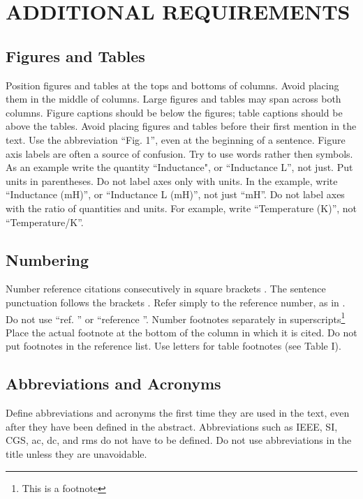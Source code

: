 \documentclass[a4paper, 10pt, conference]{ieeeconf}      %
\begin{document}
\section{ADDITIONAL REQUIREMENTS}

\subsection{Figures and Tables}

Position figures and tables at the tops and bottoms of columns.
Avoid placing them in the middle of columns. Large figures and tables
may span across both columns. Figure captions should be below the figures;
 table captions should be above the tables. Avoid placing figures and tables
  before their first mention in the text. Use the abbreviation ``Fig. 1'',
  even at the beginning of a sentence.
Figure axis labels are often a source of confusion.
Try to use words rather then symbols. As an example write the quantity ``Inductance",
 or ``Inductance L'', not just.
 Put units in parentheses. Do not label axes only with units.
 In the example, write ``Inductance (mH)'', or ``Inductance L (mH)'', not just ``mH''.
 Do not label axes with the ratio of quantities and units.
 For example, write ``Temperature (K)'', not ``Temperature/K''.

\subsection{Numbering}

Number reference citations consecutively in square brackets \cite{c1}.
 The sentence punctuation follows the brackets \cite{c2}.
 Refer simply to the reference number, as in \cite{c3}.
 Do not use ``ref. \cite{c3}'' or ``reference \cite{c3}''.
Number footnotes separately in superscripts\footnote{This is a footnote}
Place the actual footnote at the bottom of the column in which it is cited.
Do not put footnotes in the reference list.
Use letters for table footnotes (see Table I).

\subsection{Abbreviations and Acronyms}

Define abbreviations and acronyms the first time they are used in the text,
even after they have been defined in the abstract. Abbreviations such as
IEEE, SI, CGS, ac, dc, and rms do not have to be defined. Do not use
abbreviations in the title unless they are unavoidable.
\end{document}
